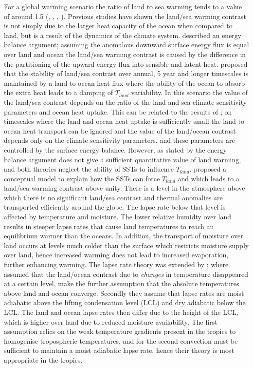 For a global warming scenario the ratio of land to sea warming tends to a value 
of around 1.5  (\citealt{Sutton2007}, \citealt{Lambert2007}, 
\citealt{Compo2008}, \citealt{Dommenget2009}). Previous studies have shown the 
land/sea warming contrast is not simply due to the larger heat capacity of the 
ocean when compared to land, but is a result of the dynamics of the climate 
system.  \citet{Sutton2007} described an energy balance argument; assuming the 
anomalous downward surface energy flux is equal over land and ocean 
\citep{Huntingford2000} the land/sea warming contrast is caused by the 
difference in the partitioning of the upward energy flux into sensible and 
latent heat.  \citet*{Lambert2007} proposed that the stability of land/sea 
contrast over annual, 5 year and longer timescales is maintained by a land to 
ocean heat flux where the ability of the ocean to absorb the extra heat leads to 
a damping of $T_{land}$ variability. In this scenario the value of the land/sea 
contrast depends on the ratio of the land and sea climate sensitivity parameters 
and ocean heat uptake. This can be related to the results of \citet{Sutton2007};
on timescales where the land and ocean heat uptake is sufficiently small the 
land to ocean heat transport can be ignored and the value of the land/ocean 
contrast depends only on the climate sensitivity parameters, and these 
parameters are controlled by the surface energy balance.  However, as stated by 
\citet{Byrne2013a} the energy balance argument does not give a sufficient 
quantitative value of land warming, and both theories neglect the ability of 
SSTs to influence $T_{land}$.  \citet{Joshi2008} proposed a conceptual model to 
explain how the SSTs can force $T_{land}$ and which leads to a land/sea warming 
contrast above unity.  There is a level in the atmosphere above which there is 
no significant land/sea contrast and thermal anomalies are transported 
efficiently around the globe. The lapse rate below that level is affected by 
temperature and moisture. The lower relative humidty over land results in 
steeper lapse rates that cause land temperatures to reach an equilibrium warmer 
than the oceans. In addition, the transport of moisture over land occurs at 
levels much colder than the surface which restricts moisture supply over land, 
hence increased warming does not lead to increased evaporation, further 
enhancing warming. The lapse rate theory was extended by \citet{Byrne2013a}; 
where \citet{Joshi2008} assumed that the land/ocean contrast due to 
\textit{changes} in temperature disappeared at a certain level, 
\citet{Byrne2013a} make the further assumption that the absolute temperatures 
above land and ocean converge. Secondly they assume that lapse rates are moist 
adiabatic above the lifting condensation level (LCL) and dry adiabatic below the 
LCL. The land and ocean lapse rates then differ due to the height of the LCL, 
which is higher over land due to reduced moisture availability. The first 
assumption relies on the weak temperature gradients present in the tropics to 
homogenise tropospheric temperatures, and for the second convection must be 
sufficient to maintain a moist adiabatic lapse rate, hence their theory is most 
appropriate in the tropics.

